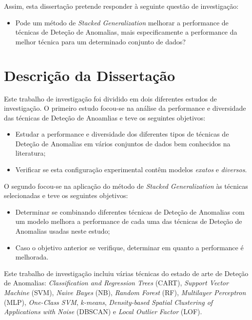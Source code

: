 \documentclass[9pt,a4paper]{extarticle}
\begin{document}
\begin{multicols}{2}
		Assim, esta dissertação pretende responder à seguinte questão de investigação:
		
		\begin{itemize}
			\item Pode um método de \textit{Stacked Generalization} melhorar a performance de técnicas de Deteção de Anomalias, mais especificamente a performance da melhor técnica para um determinado conjunto de dados?
		\end{itemize}
		
		
		\section{Descrição da Dissertação}\label{sec:work}
		
		Este trabalho de investigação foi dividido em dois diferentes estudos de investigação. O primeiro estudo focou-se na análise da performance e diversidade das técnicas de Deteção de Anoamlias e teve os seguintes objetivos:
		
		\begin{itemize}
			\item Estudar a performance e diversidade dos diferentes tipos de técnicas de Deteção de Anomalias em vários conjuntos de dados bem conhecidos na literatura;
			\item Verificar se esta configuração experimental contêm modelos \textit{exatos} e \textit{diversos}.
		\end{itemize}
		
		O segundo focou-se na aplicação do método de \textit{Stacked Generalization} às técnicas selecionadas e teve os seguintes objetivos:
		
		\begin{itemize}
			\item Determinar se combinando diferentes técnicas de Deteção de Anomalias com um modelo melhora a performance de cada uma das técnicas de Deteção de Anomalias usadas neste estudo;
			\item Caso o objetivo anterior se verifique, determinar em quanto a performance é melhorada.
		\end{itemize}
		
		Este trabalho de investigação incluiu várias técnicas do estado de arte de Deteção de Anomalias:  \textit{Classification and Regression Trees} (CART),  \textit{Support Vector Machine }(SVM), \textit{Naive Bayes} (NB),  \textit{Random Forest} (RF), \textit{Multilayer Perceptron} (MLP), \textit{One-Class SVM}, \textit{k-means}, \textit{Density-based Spatial Clustering of Applications with Noise} (DBSCAN) e \textit{Local Outlier Factor} (LOF).
		

\end{multicols}
\end{document}
